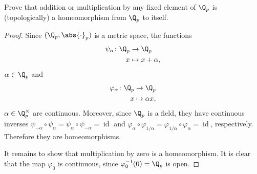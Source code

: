 \documentclass[10pt]{amsart}
\begin{document}
\setcounter{thm}{5}
\begin{thm}
  Prove that addition or multiplication by any fixed element of $\Q_p$ is (topologically)
  a homeomorphism from $\Q_p$ to itself.
  \begin{proof}
    Since $(\Q_p, \abs{\cdot}_p)$ is a metric space, the functions 
    \begin{align*}
      \psi_\alpha \colon \Q_p &\rightarrow \Q_p\\
      x &\mapsto x + \alpha,
    \end{align*}
     $\alpha \in \Q_p$ and 
    \begin{align*}
      \varphi_\alpha \colon \Q_p &\rightarrow \Q_p\\
      x &\mapsto \alpha x,
    \end{align*}
    $\alpha \in \Q_p^\times$ are continuous.
    Moreover, since $\Q_p$ is a field, they have continuous inverses $\psi_{-\alpha} \circ \psi_{\alpha} = \psi_{\alpha} \circ \psi_{-\alpha} = \operatorname{id}$ and $\varphi_{\alpha} \circ \varphi_{1/\alpha} = \varphi_{1/\alpha} \circ \varphi_{\alpha} = \operatorname{id}$, respectively.
    Therefore they are homeomorphisms.
    
    It remains to show that multiplication by zero is a homeomorphism.
    It is clear that the map $\varphi_0$ is continuous, since $\varphi_0^{-1}(0) = \Q_p$ is open.
  \end{proof}
\end{thm}
\end{document}

